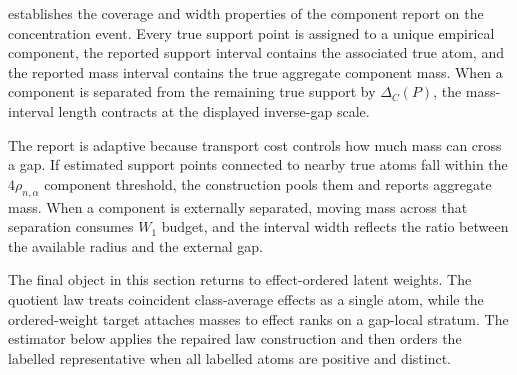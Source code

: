  establishes the coverage and width properties of the component report on the concentration event. Every true support point is assigned to a unique empirical component, the reported support interval contains the associated true atom, and the reported mass interval contains the true aggregate component mass. When a component is separated from the remaining true support by \(\Delta_C(P)\), the mass-interval length contracts at the displayed inverse-gap scale.

The report is adaptive because transport cost controls how much mass can cross a gap. If estimated support points connected to nearby true atoms fall within the \(4\rho_{n,\alpha}\) component threshold, the construction pools them and reports aggregate mass. When a component is externally separated, moving mass across that separation consumes \(W_1\) budget, and the interval width reflects the ratio between the available radius and the external gap.

The final object in this section returns to effect-ordered latent weights. The quotient law treats coincident class-average effects as a single atom, while the ordered-weight target attaches masses to effect ranks on a gap-local stratum. The estimator below applies the repaired law construction and then orders the labelled representative when all labelled atoms are positive and distinct.

